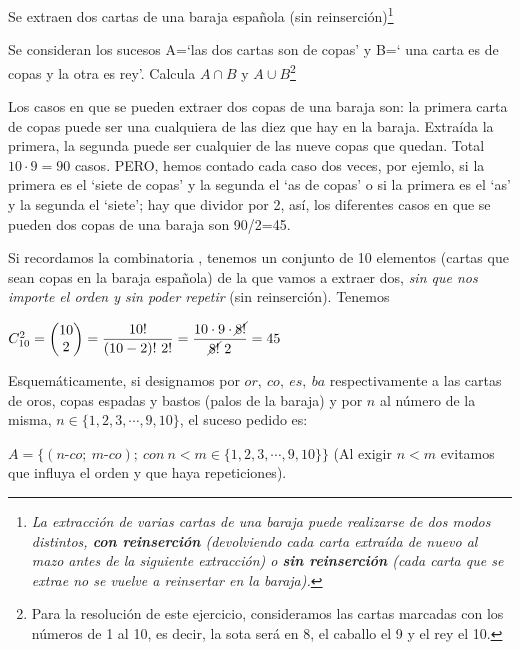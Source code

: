 \begin{ejemplo}
\begin{ejre}
Se extraen dos cartas de una baraja española (sin reinserción)\footnote{\emph{La extracción de varias cartas de una baraja puede realizarse de dos modos distintos, \textbf{con reinserción} (devolviendo cada carta extraída de nuevo al mazo antes de la siguiente extracción) o \textbf{sin reinserción} (cada carta que se extrae no se vuelve a reinsertar en la baraja).}}

Se consideran los sucesos A=`las dos cartas son de copas' y B=` una carta es de copas y la otra es rey'. Calcula $A\cap B$ y $A\cup B$\footnote{Para la resolución de este ejercicio, consideramos las cartas marcadas con los números de 1 al 10, es decir, la sota será en 8, el caballo el 9 y el rey el 10.}
\end{ejre}
\vspace{4mm} 

Los casos en que se pueden extraer dos copas de una baraja son: la primera carta de copas puede ser una cualquiera de las diez que hay en la baraja. Extraída la primera, la segunda puede ser cualquier de las nueve copas que quedan. Total $10\cdot 9=90$ casos. PERO, hemos contado cada caso dos veces, por ejemlo, si la primera es el `siete de copas' y la segunda el `as de copas' o si la primera es el `as' y la segunda el `siete'; hay que dividor por 2, así, los diferentes casos en que se pueden dos copas de una baraja son 90/2=45.

Si recordamos la combinatoria , tenemos un conjunto de 10 elementos (cartas  que sean copas en la baraja española) de la que vamos a extraer dos, \emph{sin que nos importe el orden y sin poder repetir} (sin reinserción). Tenemos 

$C_{10}^2=\mqty(10\\2)=\dfrac{10!}{(10-2)!\ 2!}=\dfrac {10\cdot 9\cdot \cancel{8!}}{\cancel{8!}\ 2}=45$

Esquemáticamente, si designamos por  $or,\ co,\ es,\ ba$ respectivamente a las cartas de oros, copas espadas y bastos (palos de la baraja) y por $n$ al número de la misma, $n\in \{1,2,3,\cdots, 9, 10\}$, el suceso pedido es:

$A=\{(n\text{-}co;\ m\text{-}co);\ con \ n<m\in \{1,2,3,\cdots, 9, 10\} \}$ \textcolor{gris}{(Al exigir $n<m$ evitamos que influya el orden y que haya repeticiones).}




\end{ejemplo}
